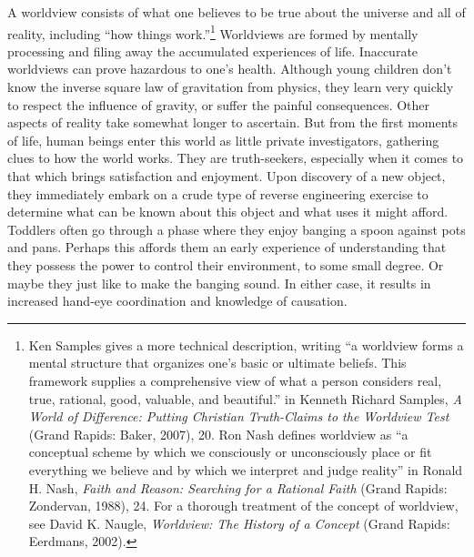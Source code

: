 A worldview consists of what one believes to be true about the universe
and all of reality, including “how things work.”\footnote{Ken Samples gives a more technical description,
writing “a worldview forms a mental structure that organizes one’s
basic or ultimate beliefs. This framework supplies a comprehensive view
of what a person considers real, true, rational, good, valuable, and
beautiful.” in Kenneth Richard Samples, \textit{A World of Difference:
Putting Christian Truth-Claims to the Worldview Test} (Grand Rapids:
Baker, 2007), 20. Ron Nash defines worldview as “a conceptual scheme by
which we consciously or unconsciously place or fit everything we
believe and by which we interpret and judge reality” in Ronald H. Nash,
\textit{Faith and Reason: Searching for a Rational Faith} (Grand
Rapids: Zondervan, 1988), 24. For a thorough treatment of the concept
of worldview, see David K. Naugle, \textit{Worldview: The History of a
Concept} (Grand Rapids: Eerdmans, 2002).}
Worldviews are formed by mentally processing and filing away the
accumulated experiences of life. Inaccurate worldviews can prove
hazardous to one’s health. Although young children don’t know the
inverse square law of gravitation from physics, they learn very quickly
to respect the influence of gravity, or suffer the painful
consequences. Other aspects of reality take somewhat longer to
ascertain. But from the first moments of life, human beings enter this
world as little private investigators, gathering clues to how the world
works. They are truth-seekers, especially when it comes to that which
brings satisfaction and enjoyment. Upon discovery of a new object, they
immediately embark on a crude type of reverse engineering exercise to
determine what can be known about this object and what uses it might
afford. Toddlers often go through a phase where they enjoy banging a
spoon against pots and pans. Perhaps this affords them an early
experience of understanding that they possess the power to control
their environment, to some small degree. Or maybe they just like to
make the banging sound. In either case, it results in increased
hand-eye coordination and knowledge of causation.


